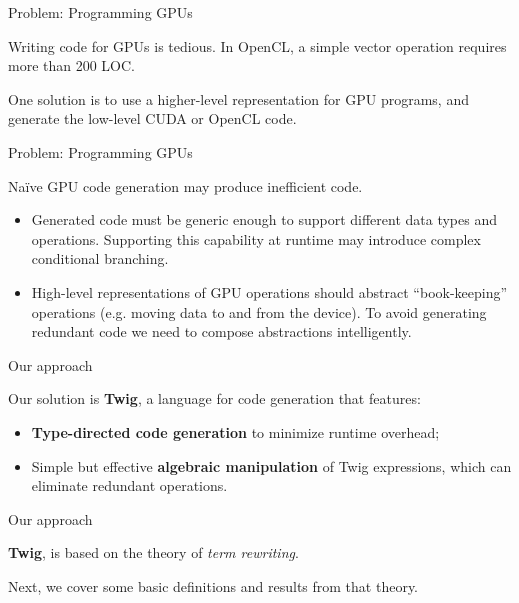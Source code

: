 \documentclass{beamer}
\begin{document}
\begin{frame}{Problem: Programming GPUs}

Writing code for GPUs is tedious. In OpenCL, a simple vector operation
requires more than 200 LOC.

One solution is to use a higher-level representation for GPU programs, and
generate the low-level CUDA or OpenCL code.

\end{frame}


\begin{frame}{Problem: Programming GPUs}

Na\"ive GPU code generation may produce inefficient code.

\begin{itemize}

\item Generated code must be generic enough to support different data types
and operations. Supporting this capability at runtime may introduce complex
conditional branching.

\item High-level representations of GPU operations should abstract
``book-keeping'' operations (e.g. moving data to and from the device). To
avoid generating redundant code we need to compose abstractions intelligently.

\end{itemize}

\end{frame}


\begin{frame}{Our approach}

Our solution is \textbf{Twig}, a language for code generation that features:

\begin{itemize}

\item \textbf{Type-directed code generation} to minimize runtime overhead;

\item Simple but effective \textbf{algebraic manipulation} of Twig
expressions, which can eliminate redundant operations.

\end{itemize}

\end{frame}


\begin{frame}{Our approach}

\textbf{Twig}, is based on the theory of \emph{term rewriting}.

Next, we cover some basic definitions and results from that theory.

\end{frame}
\end{document}
